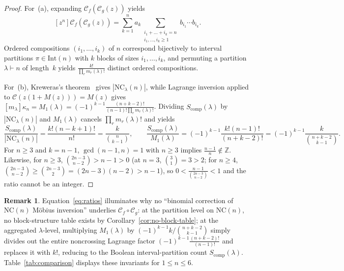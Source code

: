 \documentclass[11pt]{article}
\theoremstyle{definition}
\newtheorem{remark}[theorem]{Remark}
\newcommand{\NC}{\mathrm{NC}}
\newcommand{\IntP}{\mathrm{Int}}
\begin{document}
\begin{proof}
For~(a), expanding $\mathcal{C}_f(\mathcal{C}_g(z))$ yields
\[
  [z^n]\mathcal{C}_f(\mathcal{C}_g(z)) = \sum_{k=1}^{n} a_k \sum_{\substack{i_1+\dots+i_k = n \\ i_1,\dots,i_k \ge 1}} b_{i_1}\cdots b_{i_k}.
\]
Ordered compositions $(i_1,\dots,i_k)$ of $n$ correspond bijectively to interval partitions $\pi \in \IntP(n)$ with $k$ blocks of sizes $i_1,\dots,i_k$, and permuting a partition $\lambda \vdash n$ of length~$k$ yields $\frac{k!}{\prod_r m_r(\lambda)!}$ distinct ordered compositions.

For~(b), Kreweras's theorem~\cite{Kreweras1972,NicaSpeicher2006} gives $|\NC_\lambda(n)|$, while Lagrange inversion applied to $\mathcal{C}(z(1+M(z))) = M(z)$ gives $[m_\lambda]\kappa_n = M_1(\lambda) = (-1)^{k-1}\frac{(n+k-2)!}{(n-1)!\prod_r m_r(\lambda)!}$. Dividing $S_{\mathrm{comp}}(\lambda)$ by $|\NC_\lambda(n)|$ and $M_1(\lambda)$ cancels $\prod_r m_r(\lambda)!$ and yields
\[
  \frac{S_{\mathrm{comp}}(\lambda)}{|\NC_\lambda(n)|} = \frac{k!(n-k+1)!}{n!} = \frac{k}{\binom{n}{k-1}}, \qquad
  \frac{S_{\mathrm{comp}}(\lambda)}{M_1(\lambda)} = (-1)^{k-1}\frac{k!(n-1)!}{(n+k-2)!} = (-1)^{k-1}\frac{k}{\binom{n+k-2}{k-1}}.
\]
For $n \ge 3$ and $k = n - 1$, $\gcd(n-1, n) = 1$ with $n \ge 3$ implies $\frac{n-1}{n} \notin \mathbb{Z}$. Likewise, for $n \ge 3$, $\binom{2n-3}{n-2} > n - 1 > 0$ (at $n = 3$, $\binom{3}{1} = 3 > 2$; for $n \ge 4$, $\binom{2n-3}{n-2} \ge \binom{2n-3}{2} = (2n-3)(n-2) > n - 1$), so $0 < \frac{n-1}{\binom{2n-3}{n-2}} < 1$ and the ratio cannot be an integer.
\end{proof}

\begin{remark}
Equation~\eqref{eq:ratios} illuminates why no ``binomial correction of $\NC(n)$ M\"obius inversion'' underlies $\mathcal{C}_f \circ \mathcal{C}_g$: at the partition level on $\NC(n)$, no block-structure table exists by Corollary~\ref{cor:no-block-table}; at the aggregated $\lambda$-level, multiplying $M_1(\lambda)$ by $(-1)^{k-1} k / \binom{n+k-2}{k-1}$ simply divides out the entire noncrossing Lagrange factor $(-1)^{k-1}\frac{(n+k-2)!}{(n-1)!}$ and replaces it with $k!$, reducing to the Boolean interval-partition count $S_{\mathrm{comp}}(\lambda)$. Table~\ref{tab:comparison} displays these invariants for $1 \le n \le 6$.
\end{remark}
\end{document}
